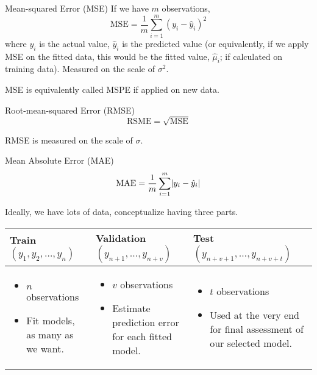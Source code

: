 \begin{Definition}{Mean-squared Error (MSE)}{}
    If we have $ m $
    observations,
    \[ \text{MSE}=\frac{1}{m} \sum_{i=1}^{m} (y_i-\hat{y}_i)^2 \]
    where $ y_i $ is the actual value, $ \hat{y}_i $ is the
    predicted value (or equivalently, if we apply MSE on the fitted
    data, this would be the fitted value, $ \hat{\mu}_i $;
    if calculated on training data).
    Measured on the scale of $ \sigma^2 $.
\end{Definition}
\begin{Remark}{}{}
    MSE is equivalently called MSPE if applied on new data.
\end{Remark}
\begin{Definition}{Root-mean-squared Error (RMSE)}{}
    \[ \text{RSME}=\sqrt{\text{MSE}} \]
\end{Definition}
\begin{Remark}{}{}
    RMSE is measured on the scale of $ \sigma $.
\end{Remark}
\begin{Definition}{Mean Absolute Error (MAE)}{}
    \[ \text{MAE}=\frac{1}{m} \sum_{i=1}^{m} \lvert y_i-\hat{y}_i\rvert \]
\end{Definition}
Ideally, we have lots of data, conceptualize having three parts.
\begin{table}[ht]
    \centering
    \begin{tabularx}{\linewidth}{@{}YYY@{}}
        \toprule
        Train $ (y_1,y_2,\ldots,y_n) $ & Validation $ (y_{n+1},\ldots,y_{n+v}) $ & Test $ (y_{n+v+1},\ldots,y_{n+v+t}) $ \\
        \midrule
        \begin{itemize}
            \item $ n $ observations
            \item Fit models, as many as we want.
        \end{itemize}
                                       &
        \begin{itemize}
            \item $ v $ observations
            \item Estimate prediction error
                  for each fitted model.
        \end{itemize}
                                       &
        \begin{itemize}
            \item $ t $ observations
            \item Used at the very end for final assessment
                  of our selected model.
        \end{itemize}                                                                                        \\
        \bottomrule
    \end{tabularx}
\end{table}

